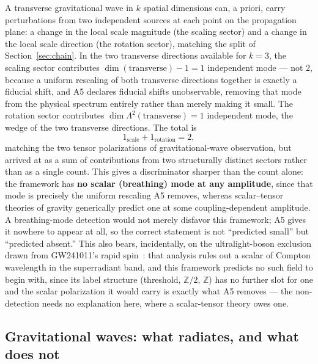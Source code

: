 \documentclass[aps,prd,twocolumn,superscriptaddress,nofootinbib]{revtex4-2}
\begin{document}
A transverse gravitational wave in $k$ spatial dimensions can, a priori,
carry perturbations from two independent sources at each point on the
propagation plane: a change in the local scale magnitude (the scaling
sector) and a change in the local scale direction (the rotation sector),
matching the split of Section~\ref{sec:chain}. In the two transverse
directions available for $k=3$, the scaling sector contributes
$\dim(\text{transverse}) - 1 = 1$ independent mode — not $2$, because a
uniform rescaling of both transverse directions together is exactly a
fiducial shift, and A5 declares fiducial shifts unobservable, removing
that mode from the physical spectrum entirely rather than merely making
it small. The rotation sector contributes $\dim\Lambda^2(\text{transverse}) = 1$
independent mode, the wedge of the two transverse directions. The total
is
\begin{equation}
1_{\text{scale}} + 1_{\text{rotation}} = 2,
\end{equation}
matching the two tensor polarizations of gravitational-wave observation,
but arrived at as a sum of contributions from two structurally distinct
sectors rather than as a single count. This gives a discriminator sharper
than the count alone: the framework has \textbf{no scalar (breathing)
mode at any amplitude}, since that mode is precisely the uniform
rescaling A5 removes, whereas scalar–tensor theories of gravity generically
predict one at some coupling-dependent amplitude. A breathing-mode
detection would not merely disfavor this framework; A5 gives it nowhere
to appear at all, so the correct statement is not ``predicted small'' but
``predicted absent.'' This also bears, incidentally, on the ultralight-boson
exclusion drawn from GW241011's rapid spin~\cite{GW241011}: that analysis
rules out a scalar of Compton wavelength in the superradiant band, and this
framework predicts no such field to begin with, since its label structure
(threshold, $\mathbb{Z}/2$, $\mathbb{Z}$) has no further slot for one and the
scalar polarization it would carry is exactly what A5 removes — the
non-detection needs no explanation here, where a scalar-tensor theory owes one.

\subsection{Gravitational waves: what radiates, and what does not}
\end{document}
